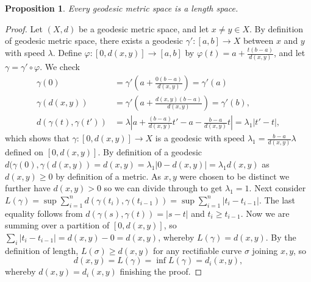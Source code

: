 \documentclass[11pt, a4paper, oneside]{memoir}
\theoremstyle{plain}\newtheorem{theorem}[subsection]{Theorem}
\newtheorem{proposition}[subsection]{Proposition}
\theoremstyle{definition}
\begin{document}
\begin{proposition}
Every geodesic metric space is a length space.\end{proposition} %
\begin{proof}
Let \((X,d)\) be a geodesic metric space, and let \(x\neq y\in X\).
By definition of geodesic metric space, there exists a geodesic \(\gamma':[a,b]\to X\) between \(x\) and \(y\) with speed \(\lambda\).
Define \(\varphi:[0,d(x,y)]\to [a,b]\) by \(\varphi(t)=a+\frac{t(b-a)}{d(x,y)}\), and let \(\gamma=\gamma'\circ\varphi\).
We check 
\begin{align*}
    \gamma(0)       &=\gamma'\left(a+\frac{0(b-a)}{d(x,y)}\right)=\gamma'(a)\\
    \gamma(d(x,y))  &=\gamma'\left(a+\frac{d(x,y)(b-a)}{d(x,y)}\right)=\gamma'(b),\\
    d(\gamma(t),\gamma(t')) &=\lambda\left|a+\frac{(b-a)}{d(x,y)}t'-a-\frac{b-a}{d(x,y)}t\right|=\lambda_1|t'-t|,
\end{align*}   
which shows that \(\gamma:[0,d(x,y)]\to X\) is a geodesic with speed \(\lambda_1=\frac{b-a}{d(x,y)}\lambda\) defined on \([0,d(x,y)]\).
By definition of a geodesic \(d(\gamma(0),\gamma(d(x,y))=d(x,y)=\lambda_1|0-d(x,y)|=\lambda_1 d(x,y)\) as \(d(x,y)\geq 0\) by definition of a metric.
As \(x,y\) were chosen to be distinct we further have \(d(x,y)>0\) so we can divide through to get \(\lambda_1=1\).
Next consider \(L(\gamma)=\sup\sum_{i=1}^nd(\gamma(t_i),\gamma(t_{i-1}))=\sup\sum_{i=1}^n |t_i-t_{i-1}|\).
The last equality follows from \(d(\gamma(s),\gamma(t))=|s-t|\) and \(t_i\geq t_{i-1}\).
Now we are summing over a partition of \([0,d(x,y)]\), so \(\sum_i |t_i-t_{i-1}|=d(x,y)-0=d(x,y)\), whereby \(L(\gamma)=d(x,y)\).
By the definition of length, \(L(\sigma)\geq d(x,y)\) for any rectifiable curve \(\sigma\) joining \(x,y\), so 
\[d(x,y)=L(\gamma)=\inf L(\gamma)=d_i(x,y),\] whereby \(d(x,y)=d_i(x,y)\) finishing the proof.\end{proof}




\end{document}
